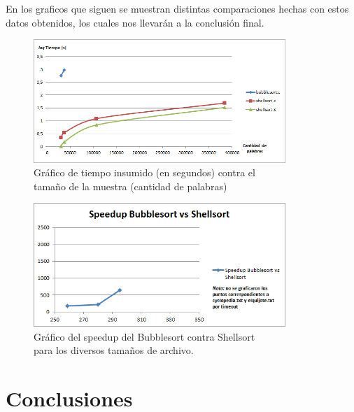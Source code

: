 \documentclass{article}
\begin{document}
	En los graficos que siguen se muestran distintas comparaciones hechas con estos datos obtenidos, los cuales nos llevarán a la conclusión final.
\bigskip\bigskip

\begin{figure}[h]
	\centering
	\includegraphics[width=0.85\textwidth]{images/imagen01.png}
	\medskip
	\caption{Gráfico de tiempo insumido (en segundos)  contra el\\ tamaño de la muestra (cantidad de palabras)}
\end{figure}

\newpage
\begin{figure}[h]
	\centering
	\includegraphics[width=0.85\textwidth]{images/imagen02.png}
	\medskip
	\caption{Gráfico del speedup del Bubblesort contra Shellsort\\ para los diversos tamaños de archivo.}
\end{figure}
\bigskip\bigskip


\section{Conclusiones}
\end{document}
